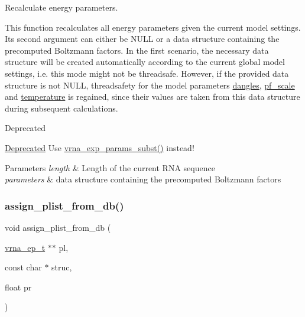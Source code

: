 Recalculate energy parameters. 

This function recalculates all energy parameters given the current model settings. It\textquotesingle{}s second argument can either be N\+U\+LL or a data structure containing the precomputed Boltzmann factors. In the first scenario, the necessary data structure will be created automatically according to the current global model settings, i.\+e. this mode might not be threadsafe. However, if the provided data structure is not N\+U\+LL, threadsafety for the model parameters \mbox{\hyperlink{group__model__details_ga72b511ed1201f7e23ec437e468790d74}{dangles}}, \mbox{\hyperlink{group__model__details_gad3b22044065acc6dee0af68931b52cfd}{pf\+\_\+scale}} and \mbox{\hyperlink{group__model__details_gab4b11c8d9c758430960896bc3fe82ead}{temperature}} is regained, since their values are taken from this data structure during subsequent calculations.

\begin{DoxyRefDesc}{Deprecated}
\item[\mbox{\hyperlink{deprecated__deprecated000120}{Deprecated}}]Use \mbox{\hyperlink{group__energy__parameters_ga8e7ac4fab3b0cc03afbc134eaafb3525}{vrna\+\_\+exp\+\_\+params\+\_\+subst()}} instead!\end{DoxyRefDesc}



\begin{DoxyParams}{Parameters}
{\em length} & Length of the current R\+NA sequence \\
\hline
{\em parameters} & data structure containing the precomputed Boltzmann factors \\
\hline
\end{DoxyParams}
\mbox{\label{group__part__func__global__deprecated_gab61df77cf7949cd516181fce0c3d7d78}} 
\subsubsection{\texorpdfstring{assign\_plist\_from\_db()}{assign\_plist\_from\_db()}}
{\footnotesize\ttfamily void assign\+\_\+plist\+\_\+from\+\_\+db (\begin{DoxyParamCaption}\item[{\mbox{\hyperlink{group__struct__utils__plist_gab9ac98ab55ded9fb90043b024b915aca}{vrna\+\_\+ep\+\_\+t}} $\ast$$\ast$}]{pl,  }\item[{const char $\ast$}]{struc,  }\item[{float}]{pr }\end{DoxyParamCaption})}



